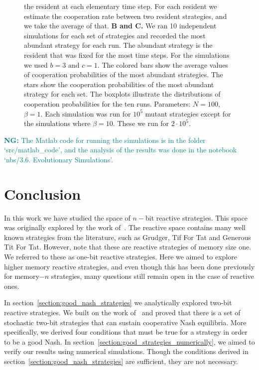 \documentclass{article}
\theoremstyle{definition}
\newcommand{\nikoleta}[1]{\textcolor{teal}{{\bf NG:} #1}}
\begin{document}
\begin{figure}[htbp]
{  the resident at each elementary time step. For each resident we estimate the
  cooperation rate between two resident strategies, and we take the average of
  that. 
  \textbf{B and C.} We ran 10 independent simulations for each set of strategies
  and recorded the most abundant strategy for each run. The abundant strategy is
  the resident that was fixed for the most time steps. For the simulations we
  used \(b=3 \text{ and } c=1\). The colored bars show the average values of
  cooperation probabilities of the most abundant strategies. The stars show the
  cooperation probabilities of the most abundant strategy for each set. The
  boxplots illustrate the distributions of cooperation probabilities for the ten
  runs.
  Parameters: \(N=100\), \(\beta=1\). Each simulation was run for \(10 ^ {5}\)
  mutant strategies except for the simulations where \(\beta=10\). These we
  run for \(2 \cdot 10 ^ {5}\).}\label{fig:three_graphs}
\end{figure}

\nikoleta{The Matlab code for running the simulations is in the folder
`src/matlab\_code', and the analysis of the results was done in the
notebook `nbs/3.6. Evolutionary Simulations'.}

\newpage

\section{Conclusion}

In this work we have studied the space of \(n-\)bit reactive strategies. This space
was originally explored by the work of~\citep{nowak:AAM:1990}. The reactive
space contains many well known strategies from the literature, such as Grudger,
Tif For Tat and Generous Tit For Tat. However, note that these are reactive
strategies of memory size one. We referred to these as one-bit reactive
strategies. Here we aimed to explore higher memory reactive strategies, and even
though this has been done previously for memory\(-n\) strategies, many questions
still remain open in the case of reactive ones.

In section~\ref{section:good_nash_strategies} we analytically explored two-bit
reactive strategies. We built on the work of~\citep{akin:EGADS:2016} and proved
that there is a set of stochastic two-bit strategies that can sustain
cooperative Nash equilibria. More specifically, we derived four conditions that
must be true for a strategy in order to be a good Nash. In
section~\ref{section:good_strategies_numerically}, we aimed to verify our
results using numerical simulations. Though the conditions derived in
section~\ref{section:good_nash_strategies} are sufficient, they are not
necessary.
\end{document}
